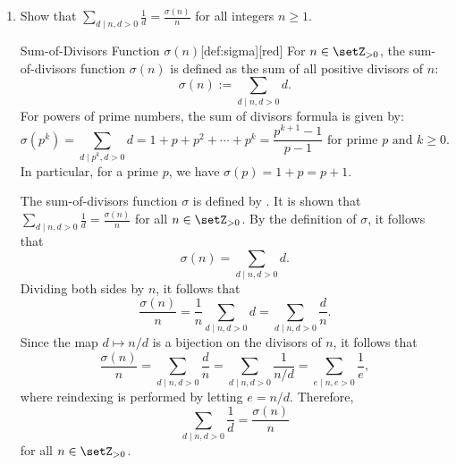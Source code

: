 \begin{enumerate}
  \newpage
  \item Show that $\sum_{d \mid n, d>0} \frac{1}{d}=\frac{\sigma(n)}{n}$ for all integers $n \geq 1$.
  \begin{define}{Sum-of-Divisors Function $\sigma(n)$}[def:sigma][red]
    For $n\in\setZ_{>0}$, the sum-of-divisors function $\sigma(n)$ is defined as the sum of all positive divisors of $n$:
    \[
    \sigma(n):=\sum_{d\mid n, d>0} d.
    \]
    For powers of prime numbers, the sum of divisors formula is given by:
    \[
    \sigma(p^k)=\sum_{d\mid p^k, d>0} d = 1 + p + p^2 + \cdots + p^k = \frac{p^{k+1}-1}{p-1} \text{ for prime } p \text{ and } k\geq 0.
    \]
    In particular, for a prime $p$, we have $\sigma(p)=1+p=p+1$.
  \end{define}
  \begin{subprove}
    The sum-of-divisors function $\sigma$ is defined by . 
    It is shown that $\sum_{d \mid n, d>0} \frac{1}{d} = \frac{\sigma(n)}{n}$ for all $n \in \setZ_{>0}$.
    By the definition of $\sigma$, it follows that
    \[
    \sigma(n) = \sum_{d \mid n, d>0} d.
    \]
    Dividing both sides by $n$, it follows that
    \[
    \frac{\sigma(n)}{n} = \frac{1}{n} \sum_{d \mid n, d>0} d = \sum_{d \mid n, d>0} \frac{d}{n}.
    \]
    Since the map $d \mapsto n/d$ is a bijection on the divisors of $n$, it follows that
    \[
    \frac{\sigma(n)}{n} = \sum_{d \mid n, d>0} \frac{d}{n} = \sum_{d \mid n, d>0} \frac{1}{n/d} = \sum_{e \mid n, e>0} \frac{1}{e},
    \]
    where reindexing is performed by letting $e = n/d$.
    Therefore,
    \[
    \sum_{d \mid n, d>0} \frac{1}{d} = \frac{\sigma(n)}{n}
    \]
    for all $n \in \setZ_{>0}$.
  \end{subprove}


\end{enumerate}
